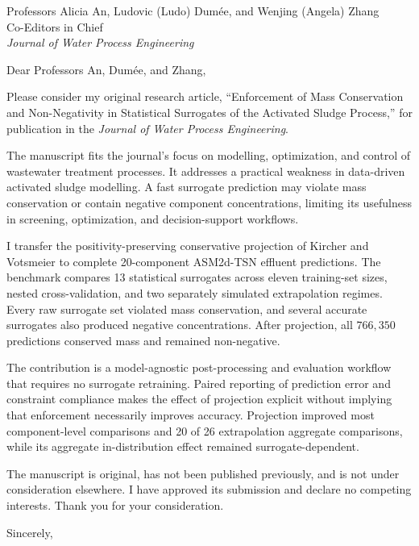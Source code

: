 \documentclass[11pt]{letter}
\date{\today}
\begin{document}
\begin{letter}{Professors Alicia An, Ludovic (Ludo) Dum\'ee, and Wenjing (Angela) Zhang\\
Co-Editors in Chief\\
\textit{Journal of Water Process Engineering}}

\opening{Dear Professors An, Dum\'ee, and Zhang,}

Please consider my original research article, ``Enforcement of Mass Conservation and Non-Negativity in Statistical Surrogates of the Activated Sludge Process,'' for publication in the \textit{Journal of Water Process Engineering}.

The manuscript fits the journal's focus on modelling, optimization, and control of wastewater treatment processes. It addresses a practical weakness in data-driven activated sludge modelling. A fast surrogate prediction may violate mass conservation or contain negative component concentrations, limiting its usefulness in screening, optimization, and decision-support workflows.

I transfer the positivity-preserving conservative projection of Kircher and Votsmeier to complete 20-component ASM2d-TSN effluent predictions. The benchmark compares 13 statistical surrogates across eleven training-set sizes, nested cross-validation, and two separately simulated extrapolation regimes. Every raw surrogate set violated mass conservation, and several accurate surrogates also produced negative concentrations. After projection, all $766{,}350$ predictions conserved mass and remained non-negative.

The contribution is a model-agnostic post-processing and evaluation workflow that requires no surrogate retraining. Paired reporting of prediction error and constraint compliance makes the effect of projection explicit without implying that enforcement necessarily improves accuracy. Projection improved most component-level comparisons and 20 of 26 extrapolation aggregate comparisons, while its aggregate in-distribution effect remained surrogate-dependent.

The manuscript is original, has not been published previously, and is not under consideration elsewhere. I have approved its submission and declare no competing interests. Thank you for your consideration.

\closing{Sincerely,}

\end{letter}
\end{document}
